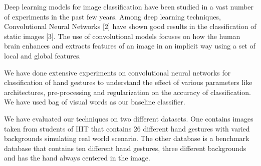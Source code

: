 \documentclass[conference]{IEEEtran}
\begin{document}
Deep learning models for image classification have been studied in a vast number of experiments in the past few years. Among deep learning techniques, Convolutional Neural Networks [2] have shown good results in the classification of static images [3]. The use of convolutional models focuses on how the human brain enhances and extracts features of an image in an implicit way using a set of local and global features.

We have done extensive experiments on convolutional neural networks for classification of hand gestures to understand the effect of various parameters like architectures, pre-processing and regularization on the accuracy of classification. We have used bag of visual words as our baseline classifier.

We have evaluated our techniques on two different datasets. One contains images taken from students of IIIT that contains 26 different hand gestures with varied backgrounds simulating real world scenario. The other database is a benchmark database that contains ten different hand gestures, three different backgrounds and has the hand always centered in the image.


%
%

\end{document}
